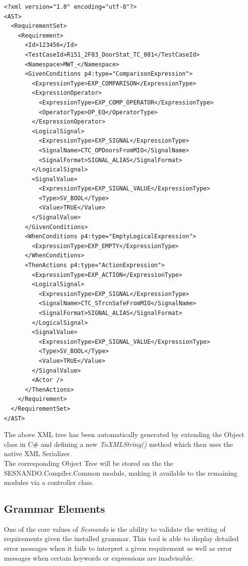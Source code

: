 \lstset{language=XML}
\begin{lstlisting}
<?xml version="1.0" encoding="utf-8"?>
<AST>
  <RequirementSet>
    <Requirement>
      <Id>123456</Id>
      <TestCaseId>R151_2F03_DoorStat_TC_001</TestCaseId>
      <Namespace>MWT_</Namespace>
      <GivenConditions p4:type="ComparisonExpression">
        <ExpressionType>EXP_COMPARISON</ExpressionType>
        <ExpressionOperator>
          <ExpressionType>EXP_COMP_OPERATOR</ExpressionType>
          <OperatorType>OP_EQ</OperatorType>
        </ExpressionOperator>
        <LogicalSignal>
          <ExpressionType>EXP_SIGNAL</ExpressionType>
          <SignalName>CTC_OPDoorsFromMIO</SignalName>
          <SignalFormat>SIGNAL_ALIAS</SignalFormat>
        </LogicalSignal>
        <SignalValue>
          <ExpressionType>EXP_SIGNAL_VALUE</ExpressionType>
          <Type>SV_BOOL</Type>
          <Value>TRUE</Value>
        </SignalValue>
      </GivenConditions>
      <WhenConditions p4:type="EmptyLogicalExpression">
        <ExpressionType>EXP_EMPTY</ExpressionType>
      </WhenConditions>
      <ThenActions p4:type="ActionExpression">
        <ExpressionType>EXP_ACTION</ExpressionType>
        <LogicalSignal>
          <ExpressionType>EXP_SIGNAL</ExpressionType>
          <SignalName>CTC_STrcnSafeFromMIO</SignalName>
          <SignalFormat>SIGNAL_ALIAS</SignalFormat>
        </LogicalSignal>
        <SignalValue>
          <ExpressionType>EXP_SIGNAL_VALUE</ExpressionType>
          <Type>SV_BOOL</Type>
          <Value>TRUE</Value>
        </SignalValue>
        <Actor />
      </ThenActions>
    </Requirement>
  </RequirementSet>
</AST>
\end{lstlisting}
\label{code:xml_output}

The above XML tree has been automatically generated by extending the Object class in C\# and defining a new \textit{ToXMLString()} method which then uses the native XML Serializer.\\
The corresponding Object Tree will be stored on the the SESNANDO.Compiler.Common module, making it available to the remaining modules via a controller class.


\subsection{Grammar Elements}
\label{subsec:grammar_elements}


One of the core values of \textit{Sesnando} is the ability to validate the writing of requirements given the installed grammar. This tool is able to display detailed error messages when it fails to interpret a given requirement as well as error messages when certain keywords or expressions are inadvisable. \\

